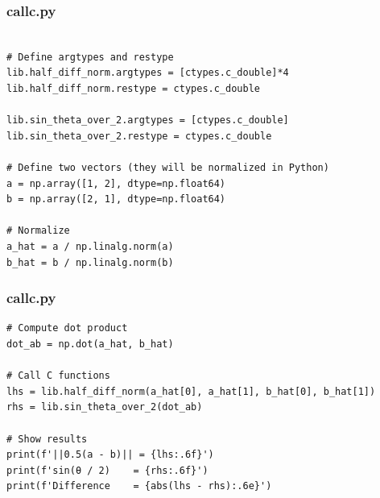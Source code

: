 \documentclass{beamer}
\begin{document}
\begin{frame}[fragile]
\frametitle{callc.py}
    \begin{lstlisting}
        
# Define argtypes and restype
lib.half_diff_norm.argtypes = [ctypes.c_double]*4
lib.half_diff_norm.restype = ctypes.c_double

lib.sin_theta_over_2.argtypes = [ctypes.c_double]
lib.sin_theta_over_2.restype = ctypes.c_double

# Define two vectors (they will be normalized in Python)
a = np.array([1, 2], dtype=np.float64)
b = np.array([2, 1], dtype=np.float64)

# Normalize
a_hat = a / np.linalg.norm(a)
b_hat = b / np.linalg.norm(b)

    \end{lstlisting}
\end{frame}
\begin{frame}[fragile]
\frametitle{callc.py}
    \begin{lstlisting}
# Compute dot product
dot_ab = np.dot(a_hat, b_hat)

# Call C functions
lhs = lib.half_diff_norm(a_hat[0], a_hat[1], b_hat[0], b_hat[1])
rhs = lib.sin_theta_over_2(dot_ab)

# Show results
print(f'||0.5(a - b)|| = {lhs:.6f}')
print(f'sin(θ / 2)    = {rhs:.6f}')
print(f'Difference    = {abs(lhs - rhs):.6e}')

\end{lstlisting}
\end{frame}
\end{document}
